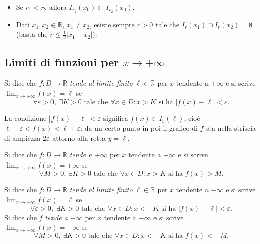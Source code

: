 \documentclass[11pt,a4paper]{article}
\begin{document}
\begin{proprieta}
\begin{itemize}
    \item Se $r_1 < r_2$ allora $I_{r_1}(x_0) \subset I_{r_2}(x_0)$.
    \item Dati $x_1, x_2 \in \mathbb{R}$, $x_1 \neq x_2$, esiste sempre $r > 0$ tale che $I_r(x_1) \cap I_r(x_2) = \emptyset$ (basta che $r \le \tfrac{1}{2}|x_1 - x_2|$).
\end{itemize}
\end{proprieta}

\subsection{Limiti di funzioni per $x \to \pm\infty$}

\begin{definizione}
Si dice che $f : D \to \mathbb{R}$ \emph{tende al limite finito} $\ell \in \mathbb{R}$ per $x$ tendente a $+\infty$ e si scrive $\displaystyle\lim_{x \to +\infty} f(x) = \ell$ se
\[
\forall \varepsilon > 0,\ \exists K > 0 \text{ tale che } \forall x \in D : x > K \text{ si ha } |f(x) - \ell| < \varepsilon .
\]
\end{definizione}

La condizione $|f(x) - \ell| < \varepsilon$ significa $f(x) \in I_\varepsilon(\ell)$, cioè $\ell - \varepsilon < f(x) < \ell + \varepsilon$: da un certo punto in poi il grafico di $f$ sta nella striscia di ampiezza $2\varepsilon$ attorno alla retta $y = \ell$.

\begin{definizione}
Si dice che $f : D \to \mathbb{R}$ \emph{tende a $+\infty$} per $x$ tendente a $+\infty$ e si scrive $\displaystyle\lim_{x \to +\infty} f(x) = +\infty$ se
\[
\forall M > 0,\ \exists K > 0 \text{ tale che } \forall x \in D : x > K \text{ si ha } f(x) > M .
\]
\end{definizione}

\begin{definizione}
Si dice che $f : D \to \mathbb{R}$ \emph{tende al limite finito} $\ell \in \mathbb{R}$ per $x$ tendente a $-\infty$ e si scrive $\displaystyle\lim_{x \to -\infty} f(x) = \ell$ se
\[
\forall \varepsilon > 0,\ \exists K > 0 \text{ tale che } \forall x \in D : x < -K \text{ si ha } |f(x) - \ell| < \varepsilon .
\]
Si dice che $f$ \emph{tende a $-\infty$} per $x$ tendente a $-\infty$ e si scrive $\displaystyle\lim_{x \to -\infty} f(x) = -\infty$ se
\[
\forall M > 0,\ \exists K > 0 \text{ tale che } \forall x \in D : x < -K \text{ si ha } f(x) < -M .
\]
\end{definizione}
\end{document}
